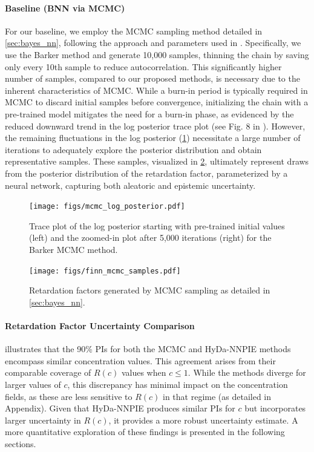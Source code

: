 \paragraph{Baseline (BNN via MCMC)}
For our baseline, we employ the MCMC sampling method detailed in \cref{sec:bayes_nn}, following the approach and parameters used in \cite{finn}. Specifically, we use the Barker method and generate 10,000 samples, thinning the chain by saving only every 10th sample to reduce autocorrelation. This significantly higher number of samples, compared to our proposed methods, is necessary due to the inherent characteristics of MCMC. While a burn-in period is typically required in MCMC to discard initial samples before convergence, initializing the chain with a pre-trained model mitigates the need for a burn-in phase, as evidenced by the reduced downward trend in the log posterior trace plot (see Fig. 8 in \cite{finn}). However, the remaining fluctuations in the log posterior (\cref{fig:mcmc_log_posterior}) necessitate a large number of iterations to adequately explore the posterior distribution and obtain representative samples. These samples, visualized in \cref{fig:mcmc_samples}, ultimately represent draws from the posterior distribution of the retardation factor, parameterized by a neural network, capturing both aleatoric and epistemic uncertainty.


\begin{figure}[h!]
    \centering
    \texttt{[image: figs/mcmc\_log\_posterior.pdf]}
    \caption{Trace plot of the log posterior starting with pre-trained initial values (left) and the zoomed-in plot after 5,000 iterations (right) for the Barker MCMC method.}
    \label{fig:mcmc_log_posterior}
\end{figure}

\begin{figure}[h!]
    \centering
    \texttt{[image: figs/finn\_mcmc\_samples.pdf]}
    \caption{Retardation factors generated by MCMC sampling as detailed in \cref{sec:bayes_nn}.}
    \label{fig:mcmc_samples}
\end{figure}


\paragraph{Retardation Factor Uncertainty Comparison}
 illustrates that the 90\% PIs for both the MCMC and HyDa-NNPIE methods encompass similar concentration values. This agreement arises from their comparable coverage of $R(c)$ values when $c \leq 1$. While the methods diverge for larger values of $c$, this discrepancy has minimal impact on the concentration fields, as these are less sensitive to $R(c)$ in that regime (as detailed in Appendix).
Given that HyDa-NNPIE produces similar PIs for $c$ but incorporates larger uncertainty in $R(c)$, it provides a more robust uncertainty estimate. A more quantitative exploration of these findings is presented in the following sections. %

